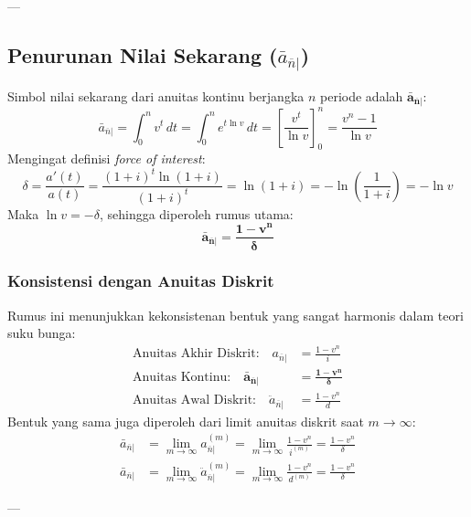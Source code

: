 \documentclass[11pt,a4paper]{article}
\begin{document}
---

\subsection{Penurunan Nilai Sekarang (\texorpdfstring{$\bar{a}_{\overline{n}|}$}{a_bar_n})}

Simbol nilai sekarang dari anuitas kontinu berjangka $n$ periode adalah $\mathbf{\bar{a}_{\overline{n}|}}$:
\begin{equation}
    \bar{a}_{\overline{n}|} = \int_0^n v^t \, dt = \int_0^n e^{t \ln v} \, dt = \left[ \frac{v^t}{\ln v} \right]_0^n = \frac{v^n - 1}{\ln v}
\end{equation}
Mengingat definisi \textit{force of interest}:
\begin{equation}
    \delta = \frac{a'(t)}{a(t)} = \frac{(1+i)^t \ln(1+i)}{(1+i)^t} = \ln(1+i) = -\ln\left(\frac{1}{1+i}\right) = -\ln v
\end{equation}
Maka $\ln v = -\delta$, sehingga diperoleh rumus utama:
\begin{equation}
    \mathbf{\bar{a}_{\overline{n}|} = \frac{1 - v^n}{\delta}}
\end{equation}

\subsubsection{Konsistensi dengan Anuitas Diskrit}
Rumus ini menunjukkan kekonsistenan bentuk yang sangat harmonis dalam teori suku bunga:
\begin{align}
    \text{Anuitas Akhir Diskrit:} \quad a_{\overline{n}|} &= \frac{1 - v^n}{i} \\
    \text{Anuitas Kontinu:} \quad \mathbf{\bar{a}_{\overline{n}|}} &= \mathbf{\frac{1 - v^n}{\delta}} \\
    \text{Anuitas Awal Diskrit:} \quad \ddot{a}_{\overline{n}|} &= \frac{1 - v^n}{d}
\end{align}
Bentuk yang sama juga diperoleh dari limit anuitas diskrit saat $m \to \infty$:
\begin{align}
    \bar{a}_{\overline{n}|} &= \lim_{m \to \infty} a_{\overline{n}|}^{(m)} = \lim_{m \to \infty} \frac{1 - v^n}{i^{(m)}} = \frac{1 - v^n}{\delta} \\
    \bar{a}_{\overline{n}|} &= \lim_{m \to \infty} \ddot{a}_{\overline{n}|}^{(m)} = \lim_{m \to \infty} \frac{1 - v^n}{d^{(m)}} = \frac{1 - v^n}{\delta}
\end{align}

---
\end{document}
